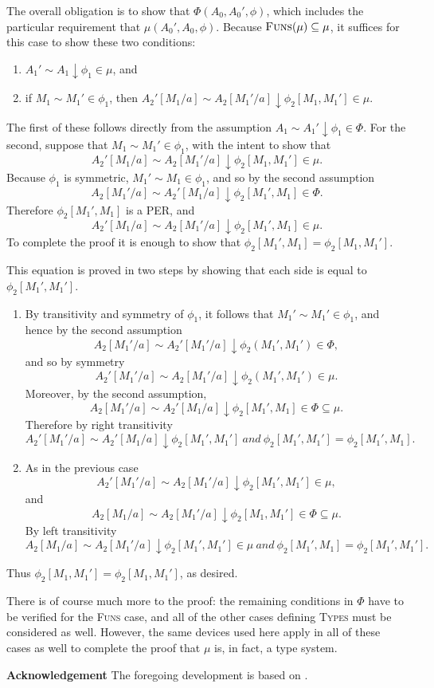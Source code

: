 \documentclass[11pt,twoside]{article}
\begin{document}
The overall obligation is to show that $\Phi(A_{0},A_{0}',\phi)$, which includes the particular
requirement that $\mu(A_{0}',A_{0},\phi)$.  Because $\textsc{Funs}(\mu)\subseteq\mu$, it suffices for this
case to show these two conditions:
\begin{enumerate}
\item $A_{1}'\sim A_{1}\downarrow\phi_{1}\in\mu$, and
\item if $M_1\sim M_1'\in\phi_{1}$, then $A_{2}'[M_1/a]\sim A_{2}[M_1'/a]\downarrow\phi_{2}[M_1,M_1']\in\mu$.
\end{enumerate}
The first of these follows directly from the assumption
$A_{1}\sim A_{1}'\downarrow\phi_{1}\in\Phi$.  For the second, suppose that
$M_1\sim M_1'\in\phi_{1}$, with the intent to show that
$$A_{2}'[M_1/a]\sim A_{2}[M_1'/a]\downarrow \phi_{2}[M_1,M_1']\in\mu.$$  Because $\phi_{1}$ is symmetric,
$M_1'\sim M_1\in\phi_{1}$, and so by the second assumption
$$A_{2}[M_1'/a] \sim A_{2}'[M_1/a]\downarrow\phi_{2}[M_1',M_1]\in\Phi.$$  Therefore $\phi_{2}[M_1',M_1]$ is a
PER, and
$$A_{2}'[M_1/a]\sim A_{2}[M_1'/a]\downarrow\phi_{2}[M_1',M_1]\in\mu.$$  To complete the proof it is
enough to show that $\phi_{2}[M_1',M_1]=\phi_{2}[M_1,M_1']$.

This equation is proved in two steps by showing that each side is equal to
$\phi_{2}[M_{1}',M_{1}']$.
\begin{enumerate}
\item By transitivity and symmetry of $\phi_{1}$, it follows that $M_{1}'\sim M_{1}'\in\phi_{1}$, and
  hence by the second assumption $$A_{2}[M_{1}'/a]\sim
  A_{2}'[M_{1}'/a]\downarrow\phi_{2}(M_{1}',M_{1}')\in\Phi,$$ and so by symmetry
  $$A_{2}'[M_{1}'/a]\sim A_{2}[M_{1}'/a]\downarrow\phi_{2}(M_{1}',M_{1}')\in\mu.$$
  Moreover, by the second assumption, $$A_{2}[M_{1}'/a] \sim
  A_{2}'[M_{1}/a]\downarrow\phi_{2}[M_{1}',M_{1}]\in\Phi\subseteq\mu.$$
  Therefore by right transitivity
  $$A_{2}'[M_{1}'/a]\sim A_{2}'[M_{1}/a]\downarrow\phi_{2}[M_{1}',M_{1}']\ \textit{and}\ \phi_{2}[M_{1}',M_{1}']=\phi_{2}[M_{1}',M_{1}].$$
\item As in the previous case $$A_{2}'[M_{1}'/a] \sim A_{2}[M_{1}'/a] \downarrow \phi_{2}[M_{1}',M_{1}']\in\mu,$$
  and $$A_{2}[M_{1}/a]\sim A_{2}[M_{1}'/a]\downarrow\phi_{2}[M_{1},M_{1}']\in\Phi\subseteq\mu.$$
  By left transitivity
  $$A_{2}[M_{1}/a] \sim A_{2}[M_{1}'/a] \downarrow \phi_{2}[M_{1}',M_{1}']\in\mu\ \textit{and}\
  \phi_2[M_1',M_1]=\phi_2[M_1',M_1'].$$
\end{enumerate}
Thus $\phi_{2}[M_{1},M_{1}']=\phi_{2}[M_{1},M_{1}']$, as desired.

\bigskip

There is of course much more to the proof: the remaining conditions in $\Phi$ have to be
verified for the \textsc{Funs} case, and all of the other cases defining \textsc{Types}
must be considered as well.  However, the same devices used here apply in all of these
cases as well to complete the proof that $\mu$ is, in fact, a type system.

\bigskip

\noindent
\textbf{Acknowledgement}
The foregoing development is based on \citet{angiuli19}.

\nocite{angiuli19}



\end{document}
